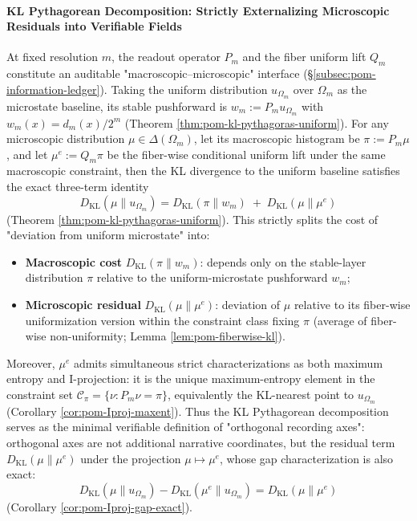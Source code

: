 \paragraph{KL Pythagorean Decomposition: Strictly Externalizing Microscopic Residuals into Verifiable Fields}
At fixed resolution \(m\), the readout operator \(P_m\) and the fiber uniform lift \(Q_m\) constitute an auditable "macroscopic–microscopic" interface (\S\ref{subsec:pom-information-ledger}).
Taking the uniform distribution \(u_{\Omega_m}\) over \(\Omega_m\) as the microstate baseline, its stable pushforward is
\(
w_m:=P_m u_{\Omega_m}
\)
with \(w_m(x)=d_m(x)/2^m\) (Theorem \ref{thm:pom-kl-pythagoras-uniform}).
For any microscopic distribution \(\mu\in\Delta(\Omega_m)\), let its macroscopic histogram be \(\pi:=P_m\mu\), and let \(\mu^e:=Q_m\pi\) be the fiber-wise conditional uniform lift under the same macroscopic constraint, then the KL divergence to the uniform baseline satisfies the exact three-term identity
\[
\boxed{\;
D_{\mathrm{KL}}(\mu\|u_{\Omega_m})
=D_{\mathrm{KL}}(\pi\|w_m)\;+\;D_{\mathrm{KL}}(\mu\|\mu^e)\;}
\]
(Theorem \ref{thm:pom-kl-pythagoras-uniform}).
This strictly splits the cost of "deviation from uniform microstate" into:
\begin{itemize}
  \item \textbf{Macroscopic cost} \(D_{\mathrm{KL}}(\pi\|w_m)\): depends only on the stable-layer distribution \(\pi\) relative to the uniform-microstate pushforward \(w_m\);
  \item \textbf{Microscopic residual} \(D_{\mathrm{KL}}(\mu\|\mu^e)\): deviation of \(\mu\) relative to its fiber-wise uniformization version within the constraint class fixing \(\pi\) (average of fiber-wise non-uniformity; Lemma \ref{lem:pom-fiberwise-kl}).
\end{itemize}
Moreover, \(\mu^e\) admits simultaneous strict characterizations as both maximum entropy and I-projection:
it is the unique maximum-entropy element in the constraint set \(\mathcal{C}_\pi=\{\nu:P_m\nu=\pi\}\), equivalently the KL-nearest point to \(u_{\Omega_m}\) (Corollary \ref{cor:pom-Iproj-maxent}).
Thus the KL Pythagorean decomposition serves as the minimal verifiable definition of "orthogonal recording axes": orthogonal axes are not additional narrative coordinates, but the residual term \(D_{\mathrm{KL}}(\mu\|\mu^e)\) under the projection \(\mu\mapsto\mu^e\), whose gap characterization is also exact:
\[
D_{\mathrm{KL}}(\mu\|u_{\Omega_m})-D_{\mathrm{KL}}(\mu^e\|u_{\Omega_m})
=D_{\mathrm{KL}}(\mu\|\mu^e)
\]
(Corollary \ref{cor:pom-Iproj-gap-exact}).

